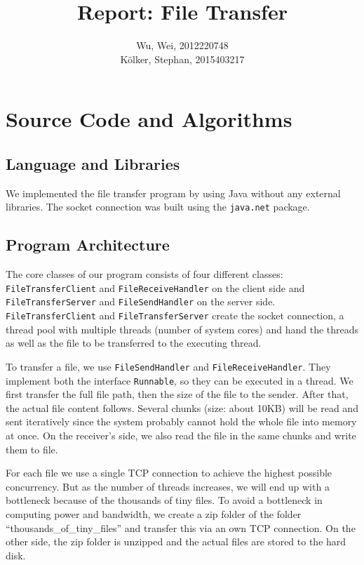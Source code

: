 \documentclass[12pt,a4paper]{article}
\title{Report: File Transfer}
\author{Wu, Wei, 2012220748 \\ Kölker, Stephan, 2015403217}
\begin{document}
\maketitle

\section{Source Code and Algorithms}

\subsection{Language and Libraries}
We implemented the file transfer program by using Java without any external libraries. The socket connection was built using the \lstinline!java.net! package.

\subsection{Program Architecture}
The core classes of our program consists of four different classes: \lstinline!FileTransferClient! and \lstinline!FileReceiveHandler! on the client side and \lstinline!FileTransferServer! and \lstinline!FileSendHandler! on the server side. \lstinline!FileTransferClient! and \lstinline!FileTransferServer! create the socket connection, a thread pool with multiple threads (number of system cores) and hand the threads as well as the file to be transferred to the executing thread.

To transfer a file, we use \lstinline!FileSendHandler! and \lstinline!FileReceiveHandler!. They implement both the interface \lstinline!Runnable!, so they can be executed in a thread. We first transfer the full file path, then the size of the file to the sender. After that, the actual file content follows. Several chunks (size: about 10KB) will be read and sent iteratively since the system probably cannot hold the whole file into memory at once. On the receiver's side, we also read the file in the same chunks and write them to file. 

For each file we use a single TCP connection to achieve the highest possible concurrency. But as the number of threads increases, we will end up with a bottleneck because of the thousands of tiny files. To avoid a bottleneck in computing power and bandwidth, we create a zip folder of the folder ``thousands\_of\_tiny\_files'' and transfer this via an own TCP connection. On the other side, the zip folder is unzipped and the actual files are stored to the hard disk.
\end{document}
